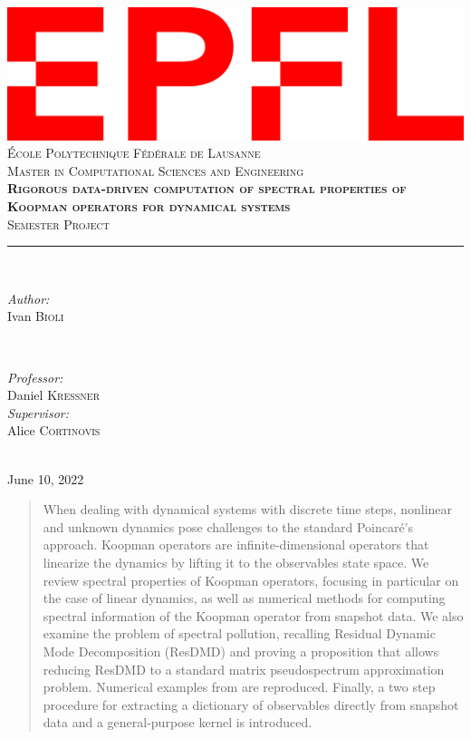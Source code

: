 \documentclass[10pt, a4paper]{report}
\begin{document}
\begin{titlepage}
	\centering
    \includegraphics[width=0.4\linewidth]{epfl.png}\\[0.5cm] 	%
    \textsc{\LARGE École Polytechnique Fédérale de Lausanne}\\
    [0.7 cm]
    \textsc{\LARGE Master in Computational Sciences and Engineering}\\
    \vspace{\fill}
    \Huge\textbf{\textsc{Rigorous data-driven computation of spectral properties of Koopman operators for dynamical systems}}\\ \vspace{\fill}		
	\textsc{\LARGE Semester Project}\\[0.4cm]
	\rule{\linewidth}{0.2 mm} \\[0.5 cm]
	\begin{minipage}{0.4\textwidth}
    \begin{flushleft} \large
    \emph{Author:}\\
    Ivan \textsc{Bioli} %
    \end{flushleft}
    \end{minipage}
    ~
    \begin{minipage}{0.4\textwidth}
    \begin{flushright} \large
    \emph{Professor:} \\
    Daniel \textsc{Kressner} \\
    \emph{Supervisor:} \\
    Alice \textsc{Cortinovis} \\
    \end{flushright}
    \end{minipage}\\
	[2cm] \Large{June 10, 2022}
	
\end{titlepage}
\restoregeometry

\begin{abstract}
\thispagestyle{empty}
When dealing with dynamical systems with discrete time steps, nonlinear and unknown dynamics pose challenges to the standard Poincaré's approach. Koopman operators are infinite-dimensional operators that linearize the dynamics by lifting it to the observables state space. We review spectral properties of Koopman operators, focusing in particular on the case of linear dynamics, as well as numerical methods for computing spectral information of the Koopman operator from snapshot data. We also examine the problem of spectral pollution, recalling Residual Dynamic Mode Decomposition (ResDMD) and proving a proposition that allows reducing ResDMD to a standard matrix pseudospectrum approximation problem. Numerical examples from \cite{colbrook_rigorous_2021} are reproduced. Finally, a two step procedure for extracting a dictionary of observables directly from snapshot data and a general-purpose kernel is introduced. 
\end{abstract}
\end{document}
